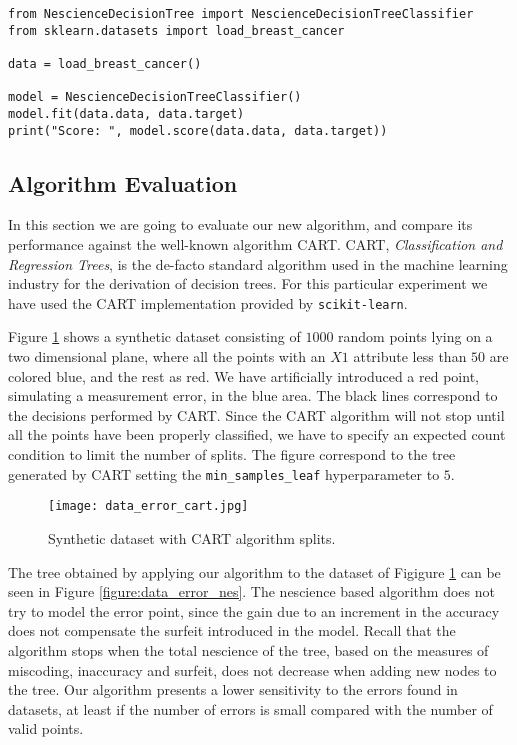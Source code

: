 \begin{sourcecode}
{\scriptsize \begin{verbatim}
from NescienceDecisionTree import NescienceDecisionTreeClassifier
from sklearn.datasets import load_breast_cancer

data = load_breast_cancer()

model = NescienceDecisionTreeClassifier()
model.fit(data.data, data.target)
print("Score: ", model.score(data.data, data.target))
\end{verbatim}}
\end{sourcecode}

\subsection{Algorithm Evaluation}
\label{sub:algorithm_evaluation}

In this section we are going to evaluate our new algorithm, and compare its performance against the well-known algorithm CART. CART, \emph{Classification and Regression Trees}, is the de-facto standard algorithm used in the machine learning industry for the derivation of decision trees. For this particular experiment we have used the CART implementation provided by \texttt{scikit-learn}.

Figure \ref{figure:data_error_cart} shows a synthetic dataset consisting of $1000$ random points lying on a two dimensional plane, where all the points with an $X1$ attribute less than $50$ are colored blue, and the rest as red. We have artificially introduced a red point, simulating a measurement error, in the blue area. The black lines correspond to the decisions performed by CART. Since the CART algorithm will not stop until all the points have been properly classified, we have to specify an expected count condition to limit the number of splits. The figure correspond to the tree generated by CART setting the \texttt{min\_samples\_leaf} hyperparameter to $5$.

\begin{figure}[h]
\centering
\texttt{[image: data\_error\_cart.jpg]}
\caption{Synthetic dataset with CART algorithm splits.}
\label{figure:data_error_cart}
\end{figure}

The tree obtained by applying our algorithm to the dataset of Figigure \ref{figure:data_error_cart} can be seen in Figure \ref{figure:data_error_nes}. The nescience based algorithm does not try to model the error point, since the gain due to an increment in the accuracy does not compensate the surfeit introduced in the model. Recall that the algorithm stops when the total nescience of the tree, based on the measures of miscoding, inaccuracy and surfeit, does not decrease when adding new nodes to the tree. Our algorithm presents a lower sensitivity to the errors found in datasets, at least if the number of errors is small compared with the number of valid points.

